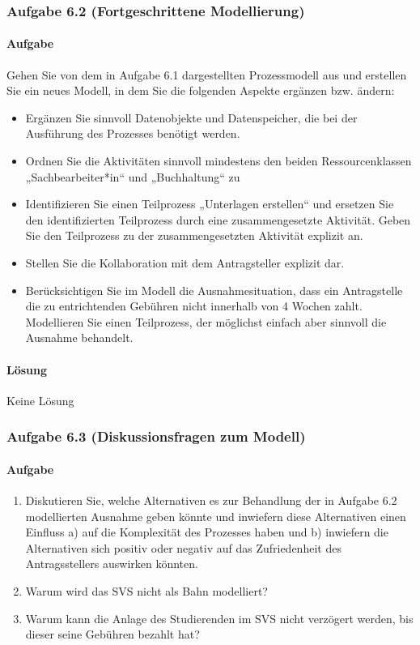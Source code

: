 \subsubsection*{Aufgabe 6.2 (Fortgeschrittene Modellierung)}
    \paragraph*{Aufgabe}
        Gehen Sie von dem in Aufgabe 6.1 dargestellten Prozessmodell aus und erstellen Sie ein neues Modell, in dem Sie die folgenden Aspekte ergänzen bzw. ändern:

        \begin{itemize}
            \item Ergänzen Sie sinnvoll Datenobjekte und Datenspeicher, die bei der Ausführung des
            Prozesses benötigt werden.
            \item Ordnen Sie die Aktivitäten sinnvoll mindestens den beiden Ressourcenklassen
            „Sachbearbeiter*in“ und „Buchhaltung“ zu
            \item Identifizieren Sie einen Teilprozess „Unterlagen erstellen“ und ersetzen Sie den
            identifizierten Teilprozess durch eine zusammengesetzte Aktivität. Geben Sie den
            Teilprozess zu der zusammengesetzten Aktivität explizit an.
            \item Stellen Sie die Kollaboration mit dem Antragsteller explizit dar.
            \item Berücksichtigen Sie im Modell die Ausnahmesituation, dass ein Antragstelle die zu entrichtenden Gebühren nicht innerhalb von 4 Wochen zahlt. Modellieren Sie einen Teilprozess, der möglichst einfach aber sinnvoll die Ausnahme behandelt.
        \end{itemize}

    \paragraph*{Lösung}
        Keine Lösung

\subsubsection*{Aufgabe 6.3 (Diskussionsfragen zum Modell)}
    \paragraph*{Aufgabe}
        \begin{enumerate}[label=\alph*)]
            \item Diskutieren Sie, welche Alternativen es zur Behandlung der in Aufgabe 6.2 modellierten Ausnahme geben könnte und inwiefern diese Alternativen einen Einfluss a) auf die Komplexität des Prozesses haben und b) inwiefern die Alternativen sich positiv oder negativ auf das Zufriedenheit des Antragsstellers auswirken könnten.
            \item Warum wird das SVS nicht als Bahn modelliert?
            \item Warum kann die Anlage des Studierenden im SVS nicht verzögert werden, bis dieser seine Gebühren bezahlt hat?
        \end{enumerate}

